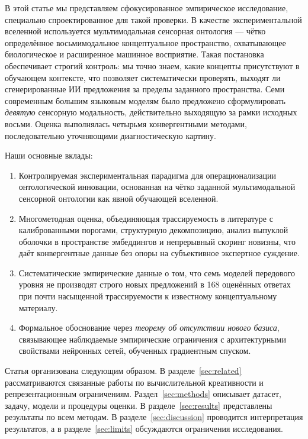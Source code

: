 \documentclass[sn-mathphys-num]{sn-jnl}
\begin{document}
В этой статье мы представляем сфокусированное эмпирическое исследование, специально спроектированное для такой проверки. В качестве экспериментальной вселенной используется мультимодальная сенсорная онтология --- чётко определённое восьмимодальное концептуальное пространство, охватывающее биологическое и расширенное машинное восприятие. Такая постановка обеспечивает строгий контроль: мы точно знаем, какие концепты присутствуют в обучающем контексте, что позволяет систематически проверять, выходят ли сгенерированные ИИ предложения за пределы заданного пространства. Семи современным большим языковым моделям было предложено сформулировать \emph{девятую} сенсорную модальность, действительно выходящую за рамки исходных восьми. Оценка выполнялась четырьмя конвергентными методами, последовательно уточняющими диагностическую картину.

Наши основные вклады:

\begin{enumerate}
\item Контролируемая экспериментальная парадигма для операционализации онтологической инновации, основанная на чётко заданной мультимодальной сенсорной онтологии как явной обучающей вселенной.
\item Многометодная оценка, объединяющая трассируемость в литературе с калиброванными порогами, структурную декомпозицию, анализ выпуклой оболочки в пространстве эмбеддингов и непрерывный скоринг новизны, что даёт конвергентные данные без опоры на субъективное экспертное суждение.
\item Систематические эмпирические данные о том, что семь моделей передового уровня не производят строго новых предложений в 168 оценённых ответах при почти насыщенной трассируемости к известному концептуальному материалу.
\item Формальное обоснование через \emph{теорему об отсутствии нового базиса}, связывающее наблюдаемые эмпирические ограничения с архитектурными свойствами нейронных сетей, обученных градиентным спуском.
\end{enumerate}

Статья организована следующим образом. В разделе~\ref{sec:related} рассматриваются связанные работы по вычислительной креативности и репрезентационным ограничениям. Раздел~\ref{sec:methods} описывает датасет, задачу, модели и процедуры оценки. В разделе~\ref{sec:results} представлены результаты по всем методам. В разделе~\ref{sec:discussion} проводится интерпретация результатов, а в разделе~\ref{sec:limits} обсуждаются ограничения исследования.
\end{document}
